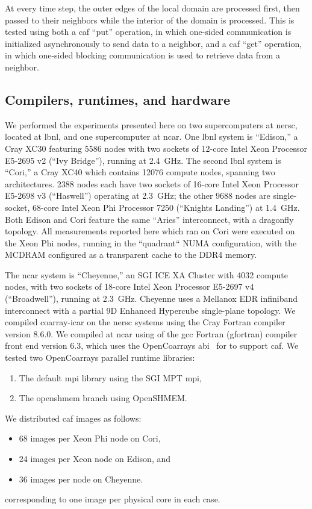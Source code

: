 At every time step, the outer edges of the local domain are processed first,
then passed to their neighbors while the interior of the domain is processed.
This is tested using both a \gls{caf} ``put'' operation, in which one-sided communication is initialized asynchronously to send data to a neighbor,
and a \gls{caf} ``get'' operation, in which one-sided blocking communication is used to retrieve data from a neighbor.

\subsection{Compilers, runtimes, and hardware}

We performed the experiments presented here on two supercomputers at \gls{nersc},
located at \gls{lbnl}, and one supercomputer at \gls{ncar}.
One \gls{lbnl} system is ``Edison,'' a Cray XC30 featuring 5586 nodes with two sockets of 12-core Intel Xeon Processor E5-2695 v2 (``Ivy Bridge''), running at \num{2.4}~\si{\giga\hertz}.
The second \gls{lbnl} system is ``Cori,'' a Cray XC40 which contains \num{12076} compute nodes, spanning two architectures. \num{2388} nodes each have two sockets of 16-core Intel Xeon Processor E5-2698 v3 (``Haswell'') operating at \num{2.3}~\si{\giga\hertz}; the other \num{9688} nodes are single-socket, 68-core Intel Xeon Phi Processor 7250 (``Knights Landing'') at \num{1.4}~\si{\giga\hertz}.
Both Edison and Cori feature the same ``Aries'' interconnect, with a dragonfly topology.
All measurements reported here which ran on Cori were executed on the Xeon Phi nodes, running in the ``quadrant`` NUMA configuration, with the MCDRAM configured as a transparent cache to the DDR4 memory.

The \gls{ncar} system is ``Cheyenne,'' an SGI ICE XA Cluster with \num{4032} compute nodes, with two sockets of 18-core Intel Xeon Processor E5-2697 v4 (``Broadwell''), running at \num{2.3}~\si{\giga\hertz}.
Cheyenne uses a Mellanox EDR infiniband interconnect with a partial 9D Enhanced Hypercube single-plane topology.
We compiled coarray-\gls{icar} on the \gls{nersc} systems using the Cray Fortran compiler version 8.6.0.  We compiled
at \gls{ncar} using of the \gls{gcc} Fortran (gfortran) compiler front end version 6.3, which uses the
OpenCoarrays \gls{abi}~\cite{fanfarillo2014opencoarrays} for to support \gls{caf}.  We tested two OpenCoarrays parallel runtime libraries:
\begin{enumerate}
  \item The default \gls{mpi} library using the SGI MPT \gls{mpi},
  \item The openshmem branch using OpenSHMEM.
\end{enumerate}
We distributed \gls{caf} images as follows:
\begin{itemize}
  \item 68 images per Xeon Phi node on Cori,
  \item 24 images per Xeon node on Edison, and
  \item 36 images per node on Cheyenne.
\end{itemize}
corresponding to one image per physical core in each case.

